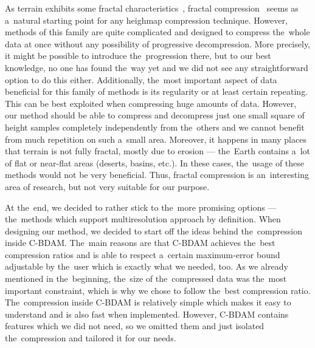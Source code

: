  As terrain exhibits some fractal characteristics~\cite{fractalChar}, fractal compression~\cite{fractal} seems as a~natural starting point for any heighmap compression technique. However, methods of this family are quite complicated and designed to compress the~whole data at once without any possibility of progressive decompression. More precisely, it might be possible to introduce the~progression there, but to our best knowledge, no one has found the~way yet and we did not see any straightforward option to do this either. Additionally, the~most important aspect of data beneficial for this family of methods is its regularity or at least certain repeating. This can be best exploited when compressing huge amounts of data. However, our method should be able to compress and decompress just one small square of height samples completely independently from the~others and we cannot benefit from much repetition on such a~small area. Moreover, it happens in many places that terrain is not fully fractal, mostly due to erosion --- the~Earth contains a~lot of flat or near-flat areas (deserts, basins, etc.). In these cases, the~usage of these methods would not be very beneficial. Thus, fractal compression is an~interesting area of research, but not very suitable for our purpose.
  
 At the~end, we decided to rather stick to the~more promising options --- the~methods which support multiresolution approach by definition. When designing our method, we decided to start off the ideas behind the~compression inside C-BDAM. The~main reasons are that C-BDAM achieves the~best compression ratios and is able to respect a~certain maximum-error bound adjustable by the~user which is exactly what we needed, too. As we already mentioned in the~beginning, the~size of the~compressed data was the~most important constraint, which is why we chose to follow the~best compression ratio. The~compression inside C-BDAM is relatively simple which makes it easy to understand and is also fast when implemented. However, C-BDAM contains features which we did not need, so we omitted t\textsl{}hem and just isolated the~compression and tailored it for our needs. 
 

